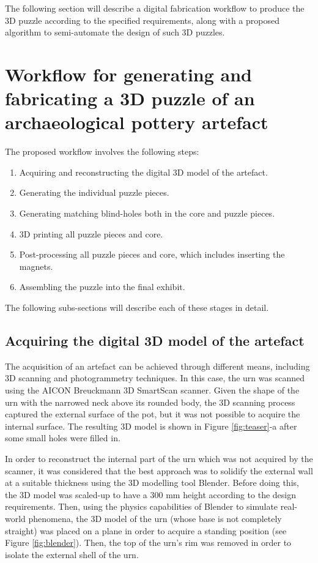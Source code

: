 \documentclass[acmlarge,screen]{acmart}
\begin{document}
The following section will describe a digital fabrication workflow to produce the 3D puzzle according to the specified requirements, along with a proposed algorithm to semi-automate the design of such 3D puzzles.

\section{Workflow for generating and fabricating a 3D puzzle of an archaeological pottery artefact}
\label{workflow}
The proposed workflow involves the following steps:
\begin{enumerate}
\item Acquiring and reconstructing the digital 3D model of the artefact.
\item Generating the individual puzzle pieces.
\item Generating matching blind-holes both in the core and puzzle pieces.
\item 3D printing all puzzle pieces and core.
\item Post-processing all puzzle pieces and core, which includes inserting the magnets.
\item Assembling the puzzle into the final exhibit.
\end{enumerate}
The following subs-sections will describe each of these stages in detail.

\subsection{Acquiring the digital 3D model of the artefact}
The acquisition of an artefact can be achieved through different means, including 3D scanning and photogrammetry techniques. In this case, the urn was scanned using the AICON Breuckmann 3D SmartScan scanner. Given the shape of the urn with the narrowed neck above its rounded body, the 3D scanning process captured the external surface of the pot, but it was not possible to acquire the internal surface. The resulting 3D model is shown in Figure \ref{fig:teaser}-a after some small holes were filled in.

In order to reconstruct the internal part of the urn which was not acquired by the scanner, it was considered that the best approach was to solidify the external wall at a suitable thickness using the 3D modelling tool Blender. Before doing this, the 3D model was scaled-up to have a 300 mm height according to the design requirements. Then, using the physics capabilities of Blender to simulate real-world phenomena, the 3D model of the urn (whose base is not completely straight) was placed on a plane in order to acquire a standing position (see Figure \ref{fig:blender}). Then, the top of the urn's rim was removed in order to isolate the external shell of the urn.
\end{document}

